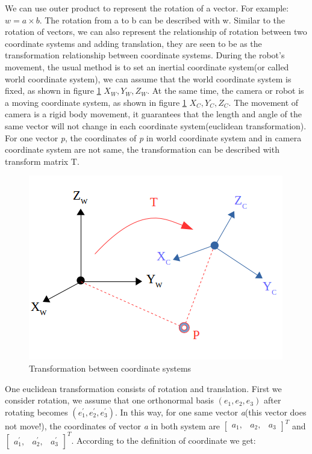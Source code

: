 We can use outer product to represent the rotation of a vector. For example: $w = a \times b$. The rotation from a to b can be described with w.
Similar to the rotation of vectors, we can also represent the relationship of rotation between two coordinate systems and adding translation, they are seen to be as the transformation relationship between coordinate systems. During the robot's movement, the usual method is to set an inertial coordinate system(or called world coordinate system), we can assume that the world coordinate system is fixed, as shown in figure \ref{fig:wcT} $X_W, Y_W, Z_W$. At the same time, the camera or robot is a moving coordinate system, as shown in figure \ref{fig:wcT} $X_C, Y_C, Z_C$. The movement of camera is a rigid body movement, it guarantees that the length and angle of the same vector will not change in each coordinate system(euclidean transformation). For one vector \textit{p}, the coordinates of \textit{p} in world coordinate system and in camera coordinate system are not same, the transformation can be described with transform matrix T.

\begin{figure}[h]
\centering
\includegraphics[scale=0.5]{./fig/wcT.png}
\caption{Transformation between coordinate systems}
\label{fig:wcT}
\end{figure}

One euclidean transformation consists of rotation and translation. First we consider rotation, we assume that one orthonormal basis $(e_1, e_2, e_3)$ after rotating becomes $(e_1^{\prime}, e_2^{\prime}, e_3^{\prime})$. In this way, for one same vector \textit{a}(this vector does not move!), the coordinates of vector \textit{a} in both system are $\begin{bmatrix} a_1,& a_2,& a_3 \end{bmatrix}^T$ and $\begin{bmatrix} a_1^{\prime}, & a_2^{\prime}, & a_3^{\prime} \end{bmatrix}^T$. According to the definition of coordinate we get:

